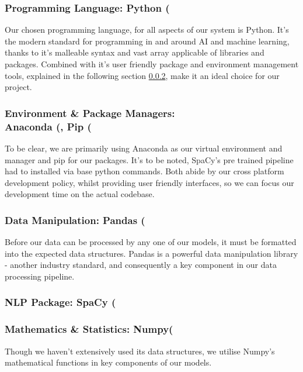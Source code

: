 \documentclass[11pt]{article}
\begin{document}
\subsubsection{Programming Language: Python (\texorpdfstring{\cite{python}})} \label{programming-language}
Our chosen programming language, for all aspects of our system is Python. It's the modern standard for programming in and around AI and machine learning, thanks to it's malleable syntax and vast array applicable of libraries and packages. Combined with it's user friendly package and environment management tools, explained in the following section \ref{environment-package-manager}, make it an ideal choice for our project.

\subsubsection{Environment \& Package Managers: \texorpdfstring{ \\ }{} Anaconda (\texorpdfstring{\cite{anaconda}}),  Pip (\texorpdfstring{\cite{pip}})} \label{environment-package-manager}
To be clear, we are primarily using Anaconda as our virtual environment and manager and pip for our packages. It's to be noted, SpaCy's pre trained pipeline had to installed via base python commands. Both abide by our cross platform development policy, whilst providing user friendly interfaces, so we can focus our development time on the actual codebase.

\subsubsection{Data Manipulation: Pandas (\texorpdfstring{\cite{pandas}})} \label{pandas}
Before our data can be processed by any one of our models, it must be formatted into the expected data structures. Pandas is a powerful data manipulation library - another industry standard, and consequently a key component in our data processing pipeline.

\subsubsection{NLP Package: SpaCy (\texorpdfstring{\cite{spacy}})} \label{spacy}


\subsubsection{Mathematics \& Statistics: Numpy(\texorpdfstring{\cite{numpy}})} \label{numpy}
Though we haven't extensively used its data structures, we utilise Numpy's mathematical functions in key components of our models. 
\end{document}
